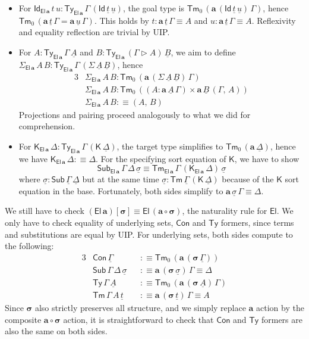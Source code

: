 \documentclass[12pt,a4paper,twoside,openany]{book}
\theoremstyle{remark}
\theoremstyle{definition}
\theoremstyle{theorem}
\newcommand{\bs}[1]{\boldsymbol{#1}}
\newcommand{\Con}{\mathsf{Con}}
\newcommand{\Sub}{\mathsf{Sub}}
\newcommand{\Tm}{\mathsf{Tm}}
\newcommand{\Ty}{\mathsf{Ty}}
\newcommand{\El}{\mathsf{El}}
\newcommand{\Id}{\mathsf{Id}}
\newcommand{\ext}{\triangleright}
\newcommand{\K}{\mathsf{K}}
\newcommand{\bsigma}{\bs{\sigma}}
\newcommand{\ba}{\bs{a}}
\newcommand{\bEl}{\bs{\El}}
\newcommand{\ul}[1]{\underline{#1}}
\newcommand{\ulGamma}{\ul{\Gamma}}
\newcommand{\ulDelta}{\ul{\Delta}}
\newcommand{\ulsigma}{\ul{\sigma}}
\newcommand{\ult}{\ul{t}}
\newcommand{\ulu}{\ul{u}}
\newcommand{\ulA}{\ul{A}}
\newcommand{\ulB}{\ul{B}}
\newcommand{\defn}{:\equiv}
\begin{document}
\begin{itemize}
  \item For $\Id_{\bs{\El\,a}}\,t\,u : \Ty_{\bs{\El\,a}}\,\Gamma\,(\Id\,\ult\,\ulu)$,
    the goal type is $\Tm_0\,(\ba\,(\Id\,\ult\,\ulu)\,\Gamma)$, hence
    $\Tm_0\,(\ba\,\ult\,\Gamma = \ba\,\ulu\,\Gamma)$. This holds by
    $t : \ba\,\ult\,\Gamma \equiv A$ and $u : \ba\,\ult\,\Gamma \equiv A$.
    Reflexivity and equality reflection are trivial by UIP.

  \item
    For $A : \Ty_{\bs{\El\,a}}\,\Gamma\,\ulA$ and $B :
    \Ty_{\bs{\El\,a}}\,(\Gamma \ext A)\,\ulB$, we aim to define
    $\Sigma_{\bs{\El\,a}}\,A\,B :
    \Ty_{\bs{\El\,a}}\,\Gamma\,(\Sigma\,\ulA\,\ulB)$, hence
    \begin{alignat*}{3}
      &\Sigma_{\bs{\El\,a}}\,A\,B : \Tm_0\,(\ba\,(\Sigma\,\ulA\,\ulB)\,\Gamma)\\
      &\Sigma_{\bs{\El\,a}}\,A\,B : \Tm_0\,((A : \ba\,\ulA\,\Gamma) \times \ba\,\ulB\,(\Gamma,\,A))\\
      &\Sigma_{\bs{\El\,a}}\,A\,B \defn (A,\,B)
    \end{alignat*}
    Projections and pairing proceed analogously to what we did for comprehension.
  \item
  For $\K_{\bs{\El\,a}}\,\Delta : \Ty_{\bs{\El\,a}}\,\Gamma\,(\K\,\ulDelta)$,
  the target type simplifies to $\Tm_0\,(\ba\,\ulDelta)$, hence we have
  $\K_{\bs{\El\,a}}\,\Delta \defn \Delta$. For the specifying sort equation of $\K$,
  we have to show
  \[
  \Sub_{\bs{\El\,a}}\,\Gamma\,\Delta\,\ulsigma \equiv
  \Tm_{\bs{\El\,a}}\,\Gamma\,(\K_{\bs{\El\,a}}\,\Delta)\,\ulsigma
  \]
  where $\ulsigma : \Sub\,\ulGamma\,\ulDelta$ but at the same time $\ulsigma :
  \Tm\,\ulGamma\,(\K\,\ulDelta)$ because of the $\K$ sort equation in the base.
  Fortunately, both sides simplify to $\ba\,\ulsigma\,\Gamma \equiv \Delta$.
\end{itemize}

\noindent We still have to check $\bs{(\El\,a)[\sigma]} \equiv \bs{\El\,(a \circ
  \sigma)}$, the naturality rule for $\bEl$. We only have to check equality of
underlying sets, $\Con$ and $\Ty$ formers, since terms and substitutions are
equal by UIP. For underlying sets, both sides compute to the following:
\begin{alignat*}{3}
  &\Con\,\ulGamma &&\defn \Tm_0\,(\ba\,(\bsigma\,\ulGamma)) \\
  &\Sub\,\Gamma\,\Delta\,\ulsigma &&\defn \ba\,(\bsigma\,\ulsigma)\,\Gamma \equiv \Delta \\
  &\Ty\,\Gamma\,\ulA &&\defn \Tm_0\,(\ba\,(\bsigma\,\ulA)\,\Gamma)\\
  &\Tm\,\Gamma\,A\,\ult &&\defn \ba\,(\bsigma\,\ult)\,\Gamma \equiv A
\end{alignat*}
Since $\bsigma$ also strictly preserves all structure, and we simply replace $\ba$ action
by the composite $\bs{a \circ \sigma}$ action, it is straightforward to check that $\Con$
and $\Ty$ formers are also the same on both sides.
\end{document}
